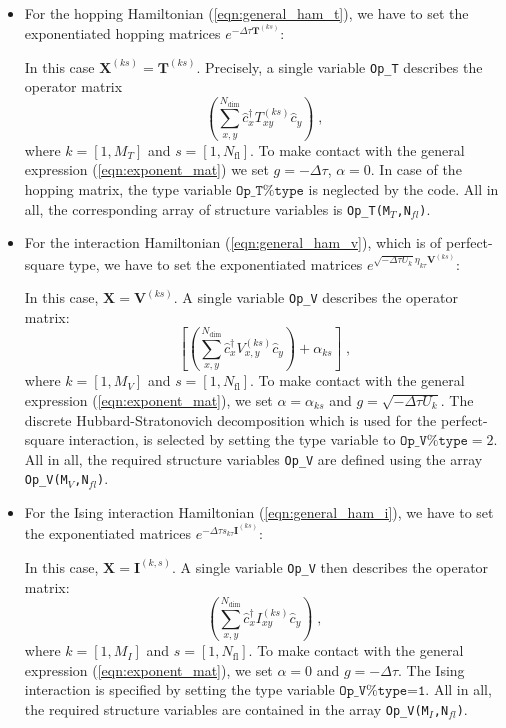 \begin{itemize}
\item For the hopping Hamiltonian (\ref{eqn:general_ham_t}), we have to set the exponentiated hopping matrices $ e^{-\Delta \tau {\bm T}^{(ks)}}$: 

In this case $\mathbf{X}^{(ks)}=\mathbf{T}^{(ks)}$. Precisely, a single variable  \texttt{Op\_T}  describes the operator matrix
\begin{equation}
            \left( \sum_{x,y}^{N_{\mathrm{dim}}} \hat{c}^{\dagger}_x T_{xy}^{(ks)} \hat{c}^{\phantom{\dagger}}_{y}  \right)  \;,
\end{equation} 
where $k=[1, M_{T}]$ and $s=[1, N_{\mathrm{fl}}]$.  
To make contact with the general expression (\ref{eqn:exponent_mat}) we set $g=-\Delta \tau$, $\alpha = 0$. 
In case of the hopping matrix, the type variable $\texttt{Op\_T\%type}$  is neglected by the code. 
All in all, the corresponding array of structure variables is  \texttt{Op\_T(M$_T$,N$_{fl}$)}.

\item For the interaction Hamiltonian (\ref{eqn:general_ham_v}), which is of perfect-square type, we have to set the exponentiated matrices $e^{  \sqrt{ -  \Delta \tau  U_k} \eta_{k\tau} {\bm V}^{(ks)} }$:

In this case, ${\mathbf X}  = \mathbf{V}^{(ks)}$. A single variable  \texttt{Op\_V}  describes the operator matrix:
\begin{equation}
             \left[ \left( \sum_{x,y}^{N_{\mathrm{dim}}} \hat{c}^{\dagger}_x V_{x,y}^{(ks)} \hat{c}^{\phantom{\dagger}}_{y}  \right)  + \alpha_{ks} \right]  \;,
\end{equation} 
where $k=[1, M_{V}]$ and $s=[1, N_{\mathrm{fl}}]$. 
To make contact with the general expression (\ref{eqn:exponent_mat}), we set  $\alpha = \alpha_{ks}$ and $g = \sqrt{-\Delta \tau  U_k}$. 
The discrete Hubbard-Stratonovich decomposition which is used for the perfect-square interaction, is selected by setting the type variable to $\texttt{Op\_V\%type}=2$.
All in all, the required structure variables \texttt{Op\_V} are defined  using the array \texttt{Op\_V(M$_V$,N$_{fl}$)}.


\item For the Ising interaction Hamiltonian (\ref{eqn:general_ham_i}), we have to set the exponentiated matrices $e^{  -\Delta \tau s_{k\tau}  {\bm I}^{(ks)}}$:

In this case, $\bm{X}  = \bm{I}^{(k,s)} $.  
A single variable  \texttt{Op\_V} then  describes the operator matrix:
\begin{equation}
            \left( \sum_{x,y}^{N_{\mathrm{dim}}} \hat{c}^{\dagger}_x I_{xy}^{(ks)} \hat{c}^{\phantom{\dagger}}_{y}  \right)  \;,
\end{equation} 
where $k=[1, M_{I}]$ and $s=[1, N_{\mathrm{fl}}]$. 
To make contact with the general expression (\ref{eqn:exponent_mat}), we set $\alpha = 0$ and $g = -\Delta \tau$.
The Ising interaction is specified by setting the type variable  $\texttt{Op\_V\%type=1}$. 
All in all, the required structure variables are contained in the array \texttt{Op\_V(M$_{I}$,N$_{fl}$)}.


\end{itemize}
